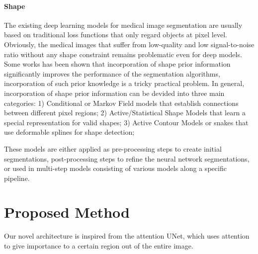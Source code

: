 \documentclass[UTF8]{article} %
\begin{document}

\paragraph{Shape} The existing deep learning models for medical image segmentation are usually based on traditional loss functions that only regard objects at pixel level. Obviously, the medical images that suffer from low-quality and low signal-to-noise ratio without any shape constraint remains problematic even for deep models. Some works has been shown that incorporation of shape prior information significantly improves the performance of the segmentation algorithms, incorporation of such prior knowledge is a tricky practical problem. In general, incorporation of shape prior information can be devided into three main categories: 1) Conditional or Markov Field models that establish connections between different pixel regions; 2) Active/Statistical Shape Models that learn a special representation for valid shapes; 3) Active Contour Models or snakes that use deformable splines for shape detection;

These models are either applied as pre-processing steps to create initial segmentations, post-processing steps to refine the neural network segmentations, or used in multi-step models consisting of various models along a specific pipeline.


\section{Proposed Method}\label{sec:method}
Our novel architecture is inspired from the attention UNet, which uses attention to give importance to a certain region out
of the entire image.
\end{document}
